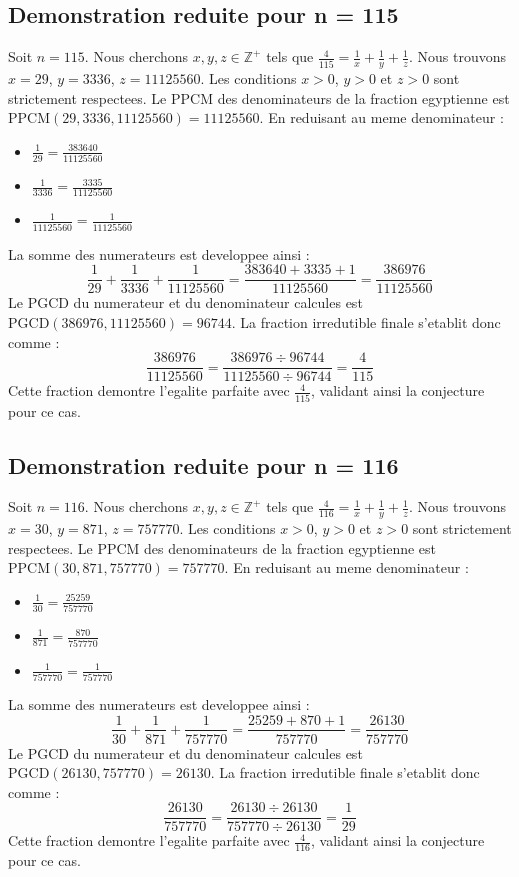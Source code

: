 \documentclass[11pt,a4paper]{article}
\begin{document}
\subsection{Demonstration reduite pour n = 115}
Soit $n = 115$. Nous cherchons $x, y, z \in \mathbb{Z}^{+}$ tels que $\frac{4}{115} = \frac{1}{x} + \frac{1}{y} + \frac{1}{z}$.
Nous trouvons $x = 29$, $y = 3336$, $z = 11125560$.
Les conditions $x > 0$, $y > 0$ et $z > 0$ sont strictement respectees.
Le PPCM des denominateurs de la fraction egyptienne est $\text{PPCM}(29, 3336, 11125560) = 11125560$.
En reduisant au meme denominateur :
\begin{itemize}
    \item $\frac{1}{29} = \frac{383640}{11125560}$
    \item $\frac{1}{3336} = \frac{3335}{11125560}$
    \item $\frac{1}{11125560} = \frac{1}{11125560}$
\end{itemize}
La somme des numerateurs est developpee ainsi :
$$ \frac{1}{29} + \frac{1}{3336} + \frac{1}{11125560} = \frac{383640 + 3335 + 1}{11125560} = \frac{386976}{11125560} $$
Le PGCD du numerateur et du denominateur calcules est $\text{PGCD}(386976, 11125560) = 96744$.
La fraction irredutible finale s'etablit donc comme :
$$ \frac{386976}{11125560} = \frac{386976 \div 96744}{11125560 \div 96744} = \frac{4}{115} $$
Cette fraction demontre l'egalite parfaite avec $\frac{4}{115}$, validant ainsi la conjecture pour ce cas.

\subsection{Demonstration reduite pour n = 116}
Soit $n = 116$. Nous cherchons $x, y, z \in \mathbb{Z}^{+}$ tels que $\frac{4}{116} = \frac{1}{x} + \frac{1}{y} + \frac{1}{z}$.
Nous trouvons $x = 30$, $y = 871$, $z = 757770$.
Les conditions $x > 0$, $y > 0$ et $z > 0$ sont strictement respectees.
Le PPCM des denominateurs de la fraction egyptienne est $\text{PPCM}(30, 871, 757770) = 757770$.
En reduisant au meme denominateur :
\begin{itemize}
    \item $\frac{1}{30} = \frac{25259}{757770}$
    \item $\frac{1}{871} = \frac{870}{757770}$
    \item $\frac{1}{757770} = \frac{1}{757770}$
\end{itemize}
La somme des numerateurs est developpee ainsi :
$$ \frac{1}{30} + \frac{1}{871} + \frac{1}{757770} = \frac{25259 + 870 + 1}{757770} = \frac{26130}{757770} $$
Le PGCD du numerateur et du denominateur calcules est $\text{PGCD}(26130, 757770) = 26130$.
La fraction irredutible finale s'etablit donc comme :
$$ \frac{26130}{757770} = \frac{26130 \div 26130}{757770 \div 26130} = \frac{1}{29} $$
Cette fraction demontre l'egalite parfaite avec $\frac{4}{116}$, validant ainsi la conjecture pour ce cas.
\end{document}
